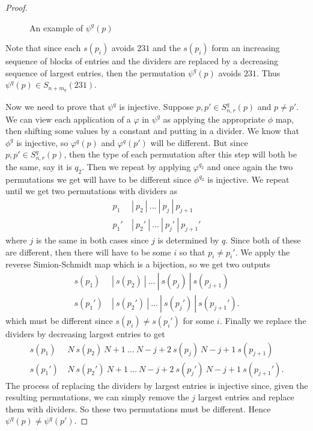 \documentclass[11pt]{amsart}
\theoremstyle{remark}
\numberwithin{equation}{section}
\begin{document}
\begin{proof}
\begin{figure}[H]
    \caption{An example of $\psi^q(p)$}
    \label{fig:placeholder}
\end{figure}

Note that since each $s(p_i)$ avoids $231$ and the $s(p_i)$ form an increasing sequence of blocks of entries and the dividers are replaced by a decreasing sequence of largest entries, then the permutation $\psi^q(p)$ avoids $231$.
Thus $\psi^q(p) \in S_{n+m_q}(231)$.

\vspace{10pt}
Now we need to prove that $\psi^q$ is injective. Suppose $p,p'\in S_{n,r}^q(p)$ and $p\neq p'$. We can view each application of a $\varphi$ in $\psi^q$ as applying the appropriate $\phi$ map, then shifting some values by a constant and putting in a divider. We know that $\phi^q$ is injective, so $\varphi^q(p)$ and $\varphi^q(p')$ will be different. But since $p,p'\in S_{n,r}^q(p)$, then the type of each permutation after this step will both be the same, say it is $q_2$. Then we repeat by applying $\varphi^{q_2}$ and once again the two permutations we get will have to be different since $\phi^{q_2}$ is injective. We repeat until we get two permutations with dividers as
\begin{align*}
p_1 \ &| \ p_2 \ | \ ... \ | \ p_{j} \ | \ p_{j+1} \\
p_1' \ &| \ p_2' \ | \ ... \ | \ p_{j}' \ | \ p_{j+1}'
\end{align*}
where $j$ is the same in both cases since $j$ is determined by $q$. Since both of these are different, then there will have to be some $i$ so that $p_i \neq p_i'$. We apply the reverse Simion-Schmidt map which is a bijection, so we get two outputs
\begin{align*}
s(p_1) \ &| \ s(p_2) \ | \ ... \ | \ s(p_{j}) \ | \ s(p_{j+1}) \\
s(p_1') \ &| \ s(p_2') \ | \ ... \ | \ s(p_{j}') \ | \ s(p_{j+1}').
\end{align*}
which must be different since $s(p_i) \neq s(p_i')$ for some $i$.
Finally we replace the dividers by decreasing largest entries to get
\begin{align*}
s(p_1) \ &N \ s(p_2) \ N + 1 \ ... \ N - j + 2 \ s(p_{j}) \ N-j+1 \ s(p_{j+1}) \\
s(p_1') \ &N \ s(p_2') \ N + 1 \ ... \ N - j + 2 \ s(p_{j}') \ N-j+1 \ s(p_{j+1}').
\end{align*}
The process of replacing the dividers by largest entries is injective since, given the resulting permutations, we can simply remove the $j$ largest entries and replace them with dividers. So these two permutations must be different. Hence $\psi^q(p) \neq \psi^q(p')$.
\end{proof}
\end{document}
